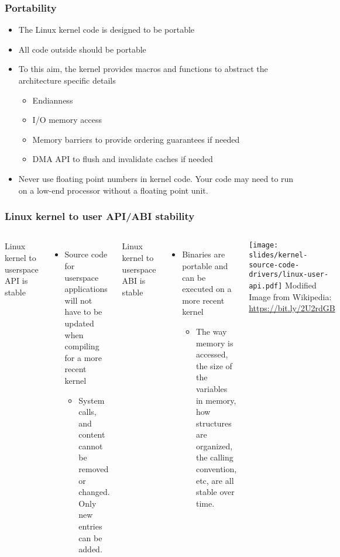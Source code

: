 \begin{frame}
  \frametitle{Portability}
  \begin{itemize}
  \item The Linux kernel code is designed to be portable
  \item All code outside  should be portable
  \item To this aim, the kernel provides macros and functions to
    abstract the architecture specific details
    \begin{itemize}
    \item Endianness
    \item I/O memory access
    \item Memory barriers to provide ordering guarantees if needed
    \item DMA API to flush and invalidate caches if needed
    \end{itemize}
  \item Never use floating point numbers in kernel code. Your code may
    need to run on a low-end processor without a floating point unit.
  \end{itemize}
\end{frame}

\begin{frame}
  \frametitle{Linux kernel to user API/ABI stability}
  \begin{columns}
    Linux kernel to userspace API is stable
    \begin{itemize}
    \item Source code for userspace applications will not have to be
      updated when compiling for a more recent kernel
      \begin{itemize}
      \item System calls,  and  content cannot be
        removed or changed. Only new entries can be added.
      \end{itemize}
    \end{itemize}
    Linux kernel to userspace ABI is stable
    \begin{itemize}
    \item Binaries are portable and can be executed on a more recent
      kernel
      \begin{itemize}
      \item The way memory is accessed, the size of the variables in
        memory, how structures are organized, the calling convention,
        etc, are all stable over time.
      \end{itemize}
    \end{itemize}
    \texttt{[image: slides/kernel-source-code-drivers/linux-user-api.pdf]}
    \tiny
    Modified Image from Wikipedia:\\
    \url{https://bit.ly/2U2rdGB}
  \end{columns}
\end{frame}

